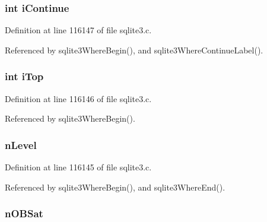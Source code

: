 \hypertarget{struct_where_info_ae3bb72cb12d44e96b691c6c71dbf1267}{}
\subsubsection[{i\+Continue}]{\setlength{\rightskip}{0pt plus 5cm}int i\+Continue}\label{struct_where_info_ae3bb72cb12d44e96b691c6c71dbf1267}


Definition at line 116147 of file sqlite3.\+c.



Referenced by sqlite3\+Where\+Begin(), and sqlite3\+Where\+Continue\+Label().

\hypertarget{struct_where_info_afd3ca9af6c497b1ae41a842e149cba2a}{}
\subsubsection[{i\+Top}]{\setlength{\rightskip}{0pt plus 5cm}int i\+Top}\label{struct_where_info_afd3ca9af6c497b1ae41a842e149cba2a}


Definition at line 116146 of file sqlite3.\+c.



Referenced by sqlite3\+Where\+Begin().

\hypertarget{struct_where_info_af57795809290e8e1bcebffb5a5cd0787}{}
\subsubsection[{n\+Level}]{ n\+Level}\label{struct_where_info_af57795809290e8e1bcebffb5a5cd0787}


Definition at line 116145 of file sqlite3.\+c.



Referenced by sqlite3\+Where\+Begin(), and sqlite3\+Where\+End().

\hypertarget{struct_where_info_ae422b7c9e7d9f1952c700fa9cfd819cb}{}
\subsubsection[{n\+O\+B\+Sat}]{ n\+O\+B\+Sat}\label{struct_where_info_ae422b7c9e7d9f1952c700fa9cfd819cb}


